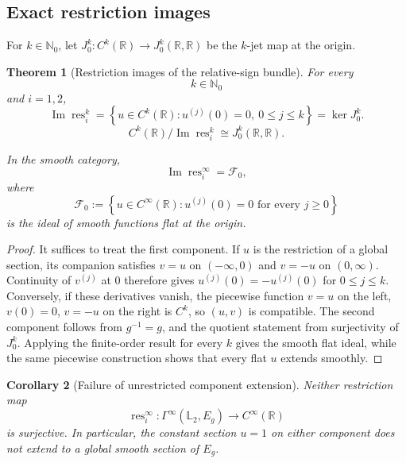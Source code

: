 \documentclass[11pt]{article}
\theoremstyle{plain}
\newtheorem{theorem}{Theorem}[section]
\newtheorem{corollary}[theorem]{Corollary}
\theoremstyle{definition}
\newcommand{\Ltwo}{\mathbb{L}_{2}}
\begin{document}
\subsection{Exact restriction images}
\label{subsec:sign-restriction-images}

For
\(k\in\mathbb N_0\),
let \(J_0^k: C^k(\mathbb R) \longrightarrow J_0^k(\mathbb R,\mathbb R)\) be the \(k\)-jet map at the origin.

\begin{theorem}[Restriction images of the relative-sign bundle]
\label{thm:sign-restriction-images}
For every
\[
  k\in\mathbb N_0
\]
and \(i=1,2\),
\[
  \boxed{
  \operatorname{Im}\operatorname{res}_i^k
  =
  \left\{
    u\in C^k(\mathbb R):
    u^{(j)}(0)=0,\
    0\leq j\leq k
  \right\}
  =
  \ker J_0^k.
  }
\]
\[
  C^k(\mathbb R)
  \big/
  \operatorname{Im}\operatorname{res}_i^k
  \cong
  J_0^k(\mathbb R,\mathbb R).
\]

In the smooth category,
\[
  \boxed{
  \operatorname{Im}\operatorname{res}_i^\infty
  =
  \mathcal F_0,
  }
\]
where
\[
  \mathcal F_0
  :=
  \left\{
    u\in C^\infty(\mathbb R):
    u^{(j)}(0)=0
    \text{ for every }j\geq0
  \right\}
\]
is the ideal of smooth functions flat at the origin.
\end{theorem}

\begin{proof}
It suffices to treat the first component. If \(u\) is the restriction of a global section, its companion satisfies \(v=u\) on \(( -\infty,0)\) and \(v=-u\) on \((0,\infty)\). Continuity of \(v^{(j)}\) at \(0\) therefore gives \(u^{(j)}(0)=-u^{(j)}(0)\) for \(0\le j\le k\). Conversely, if these derivatives vanish, the piecewise function \(v=u\) on the left, \(v(0)=0\), \(v=-u\) on the right is \(C^k\), so \((u,v)\) is compatible. The second component follows from \(g^{-1}=g\), and the quotient statement from surjectivity of \(J_0^k\). Applying the finite-order result for every \(k\) gives the smooth flat ideal, while the same piecewise construction shows that every flat \(u\) extends smoothly.
\end{proof}

\begin{corollary}[Failure of unrestricted component extension]
\label{cor:sign-nonsurjectivity}
Neither restriction map
\[
  \operatorname{res}_i^\infty:
  \Gamma^\infty(\Ltwo,E_g)
  \longrightarrow
  C^\infty(\mathbb R)
\]
is surjective. In particular, the constant section \(u=1\) on either
component does not extend to a global smooth section of \(E_g\).
\end{corollary}
\end{document}
